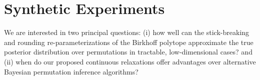 \documentclass[twoside]{article}
\DeclareRobustCommand{\parhead}[1]{\textbf{#1}~}
\begin{document}

\section{Synthetic Experiments}
\label{sec:synthetic}
We are interested in two principal questions: 
 (i) how well can the stick-breaking and rounding re-parameterizations
of the Birkhoff polytope approximate the true posterior distribution
over permutations in tractable, low-dimensional cases? and (ii)
when do our proposed continuous relaxations offer
advantages over alternative  Bayesian permutation
inference algorithms?
\end{document}
